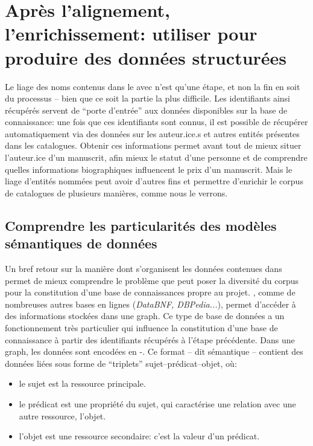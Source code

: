 \section{Après l'alignement, l'enrichissement: utiliser \sparql{} pour produire des données structurées}
Le liage des noms contenus dans le \tname{} avec \wkd{} n'est qu'une étape, et non la fin en soit du processus -- bien que ce soit la partie la plus difficile. Les identifiants ainsi récupérés servent de \enquote{porte d'entrée} aux données disponibles sur la base de connaissance: une fois que ces identifiants sont connus, il est possible de récupérer automatiquement via \sparql{} des données sur les auteur.ice.s et autres entités présentes dans les catalogues. Obtenir ces informations permet avant tout de mieux situer l'auteur.ice d'un manuscrit, afin mieux le statut d'une personne et de comprendre quelles informations biographiques influencent le prix d'un manuscrit. Mais le liage d'entités nommées peut avoir d'autres fins et permettre d'enrichir le corpus de catalogues de plusieurs manières, comme nous le verrons.

\subsection{Comprendre les particularités des modèles sémantiques de données}
Un bref retour sur la manière dont s'organisent les données contenues dans \wkd{} permet de mieux comprendre le problème que peut poser la diversité du corpus pour la constitution d'une base de connaissances propre au projet. \wkd{}, comme de nombreuses autres bases en lignes (\textit{DataBNF, DBPedia...}), permet d'accéder à des informations stockées dans une \gls{graph}. Ce type de base de données a un fonctionnement très particulier qui influence la constitution d'une base de connaissance à partir des identifiants \wkd{} récupérés à l'étape précédente. Dans une \gls{graph}, les données sont encodées en \xml{}-\rdf{}. Ce format -- dit sémantique -- contient des données liées sous forme de \enquote{triplets} sujet--prédicat--objet, où:

\begin{itemize}
	\item le sujet est la ressource principale.
	\item le prédicat est une propriété du sujet, qui caractérise une relation avec une autre ressource, l'objet.
	\item l'objet est une ressource secondaire: c'est la valeur d'un prédicat.
\end{itemize}


